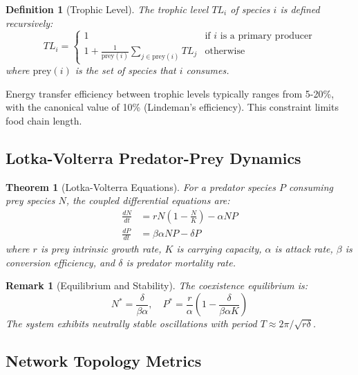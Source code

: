 \documentclass[a4paper, 11pt]{article}
\newtheorem{definition}{Definition}[section]
\newtheorem{theorem}{Theorem}[section]
\newtheorem{remark}{Remark}[section]
\begin{document}
\begin{definition}[Trophic Level]
The trophic level $TL_i$ of species $i$ is defined recursively:
\begin{equation}
TL_i = \begin{cases}
1 & \text{if } i \text{ is a primary producer} \\
1 + \frac{1}{\text{prey}(i)} \sum_{j \in \text{prey}(i)} TL_j & \text{otherwise}
\end{cases}
\end{equation}
where $\text{prey}(i)$ is the set of species that $i$ consumes.
\end{definition}

Energy transfer efficiency between trophic levels typically ranges from 5-20\%, with the canonical value of 10\% (Lindeman's efficiency). This constraint limits food chain length.

\subsection{Lotka-Volterra Predator-Prey Dynamics}

\begin{theorem}[Lotka-Volterra Equations]
For a predator species $P$ consuming prey species $N$, the coupled differential equations are:
\begin{align}
\frac{dN}{dt} &= rN\left(1 - \frac{N}{K}\right) - \alpha NP \\
\frac{dP}{dt} &= \beta \alpha NP - \delta P
\end{align}
where $r$ is prey intrinsic growth rate, $K$ is carrying capacity, $\alpha$ is attack rate, $\beta$ is conversion efficiency, and $\delta$ is predator mortality rate.
\end{theorem}

\begin{remark}[Equilibrium and Stability]
The coexistence equilibrium is:
\begin{equation}
N^* = \frac{\delta}{\beta\alpha}, \quad P^* = \frac{r}{\alpha}\left(1 - \frac{\delta}{\beta\alpha K}\right)
\end{equation}
The system exhibits neutrally stable oscillations with period $T \approx 2\pi/\sqrt{r\delta}$.
\end{remark}

\subsection{Network Topology Metrics}
\end{document}
